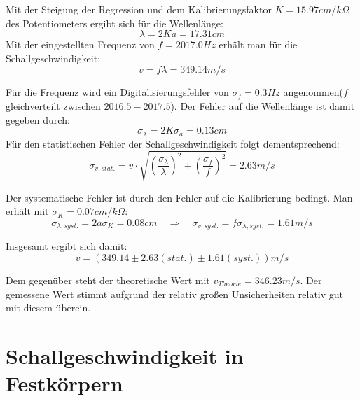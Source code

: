 \documentclass[12pt,a4paper]{article}
\begin{document}
Mit der Steigung der Regression und dem Kalibrierungsfaktor $K=15.97 cm/k\Omega$ des Potentiometers ergibt sich für die Wellenlänge:
\begin{equation}
\lambda=2Ka=17.31cm
\end{equation}
Mit der eingestellten Frequenz von $f=2017.0Hz$ erhält man für die Schallgeschwindigkeit:
\begin{equation}
v=f \lambda = 349.14m/s
\end{equation}

Für die Frequenz wird ein Digitalisierungsfehler von $\sigma_f=0.3Hz$ angenommen($f$ gleichverteilt zwischen $2016.5-2017.5$). Der Fehler auf die Wellenlänge ist damit gegeben durch:
\begin{equation}
\sigma_{\lambda}=2K \sigma_a=0.13cm
\end{equation}
Für den statistischen Fehler der Schallgeschwindigkeit folgt dementsprechend:
\begin{equation}
\sigma_{v,stat.}=v \cdot \sqrt{(\frac{\sigma_{\lambda}}{\lambda})^2+(\frac{\sigma_f}{f})^2}=2.63m/s
\end{equation}

Der systematische Fehler ist durch den Fehler auf die Kalibrierung bedingt. Man erhält mit $\sigma_K=0.07cm/k\Omega$:
\begin{equation}
\sigma_{\lambda,syst.}=2a \sigma_K=0.08cm \quad \Rightarrow \quad \sigma_{v,syst.}=f \sigma_{\lambda,syst.}=1.61m/s
\end{equation}

Insgesamt ergibt sich damit:
\begin{equation}
v=(349.14 \pm 2.63(stat.) \pm 1.61(syst.))m/s
\end{equation}

Dem gegenüber steht der theoretische Wert mit $v_{Theorie}=346.23m/s$. Der gemessene Wert stimmt aufgrund der relativ großen Unsicherheiten relativ gut mit diesem überein.















\section{Schallgeschwindigkeit in Festkörpern}
\end{document}
